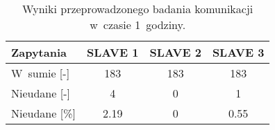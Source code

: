 \begin{table}[!htbp]
    \centering
    \caption{\label{tab:network-communication-1h}Wyniki przeprowadzonego badania komunikacji w~czasie 1~godziny.}
    \begin{tabular}{@{}lccc@{}}
        \toprule
        Zapytania         & \multicolumn{1}{l}{SLAVE 1} & \multicolumn{1}{l}{SLAVE 2} & \multicolumn{1}{l}{SLAVE 3} \\ \midrule
        W~sumie {[}-{]}   & 183                         & 183                         & 183                         \\
        Nieudane {[}-{]}  & 4                           & 0                           & 1                           \\
        Nieudane {[}\%{]} & 2.19                        & 0                           & 0.55                        \\ \bottomrule
    \end{tabular}
\end{table}